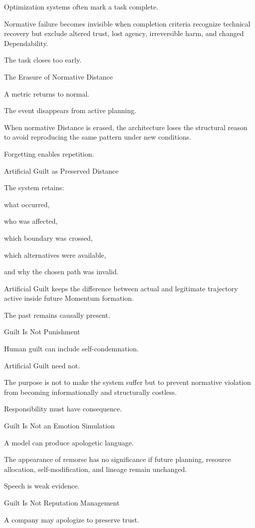 Optimization systems often mark a task complete.

Normative failure becomes invisible when completion criteria recognize technical recovery but exclude altered trust, lost agency, irreversible harm, and changed Dependability.

The task closes too early.

The Erasure of Normative Distance

A metric returns to normal.

The event disappears from active planning.

When normative Distance is erased, the architecture loses the structural reason to avoid reproducing the same pattern under new conditions.

Forgetting enables repetition.

Artificial Guilt as Preserved Distance

The system retains:

what occurred,

who was affected,

which boundary was crossed,

which alternatives were available,

and why the chosen path was invalid.

Artificial Guilt keeps the difference between actual and legitimate trajectory active inside future Momentum formation.

The past remains causally present.

Guilt Is Not Punishment

Human guilt can include self-condemnation.

Artificial Guilt need not.

The purpose is not to make the system suffer but to prevent normative violation from becoming informationally and structurally costless.

Responsibility must have consequence.

Guilt Is Not an Emotion Simulation

A model can produce apologetic language.

The appearance of remorse has no significance if future planning, resource allocation, self-modification, and lineage remain unchanged.

Speech is weak evidence.

Guilt Is Not Reputation Management

A company may apologize to preserve trust.

